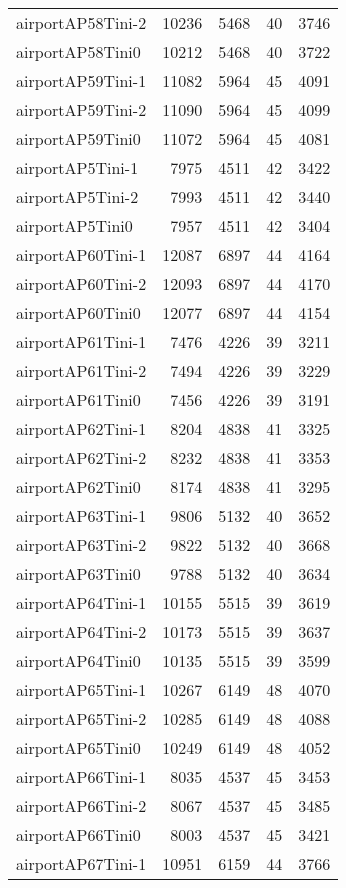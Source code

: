 \begin{longtable}{lrrrr}
airportAP58Tini-2 & 10236 & 5468 & 40 & 3746 \\
airportAP58Tini0 & 10212 & 5468 & 40 & 3722 \\
airportAP59Tini-1 & 11082 & 5964 & 45 & 4091 \\
airportAP59Tini-2 & 11090 & 5964 & 45 & 4099 \\
airportAP59Tini0 & 11072 & 5964 & 45 & 4081 \\
airportAP5Tini-1 & 7975 & 4511 & 42 & 3422 \\
airportAP5Tini-2 & 7993 & 4511 & 42 & 3440 \\
airportAP5Tini0 & 7957 & 4511 & 42 & 3404 \\
airportAP60Tini-1 & 12087 & 6897 & 44 & 4164 \\
airportAP60Tini-2 & 12093 & 6897 & 44 & 4170 \\
airportAP60Tini0 & 12077 & 6897 & 44 & 4154 \\
airportAP61Tini-1 & 7476 & 4226 & 39 & 3211 \\
airportAP61Tini-2 & 7494 & 4226 & 39 & 3229 \\
airportAP61Tini0 & 7456 & 4226 & 39 & 3191 \\
airportAP62Tini-1 & 8204 & 4838 & 41 & 3325 \\
airportAP62Tini-2 & 8232 & 4838 & 41 & 3353 \\
airportAP62Tini0 & 8174 & 4838 & 41 & 3295 \\
airportAP63Tini-1 & 9806 & 5132 & 40 & 3652 \\
airportAP63Tini-2 & 9822 & 5132 & 40 & 3668 \\
airportAP63Tini0 & 9788 & 5132 & 40 & 3634 \\
airportAP64Tini-1 & 10155 & 5515 & 39 & 3619 \\
airportAP64Tini-2 & 10173 & 5515 & 39 & 3637 \\
airportAP64Tini0 & 10135 & 5515 & 39 & 3599 \\
airportAP65Tini-1 & 10267 & 6149 & 48 & 4070 \\
airportAP65Tini-2 & 10285 & 6149 & 48 & 4088 \\
airportAP65Tini0 & 10249 & 6149 & 48 & 4052 \\
airportAP66Tini-1 & 8035 & 4537 & 45 & 3453 \\
airportAP66Tini-2 & 8067 & 4537 & 45 & 3485 \\
airportAP66Tini0 & 8003 & 4537 & 45 & 3421 \\
airportAP67Tini-1 & 10951 & 6159 & 44 & 3766 \\

\end{longtable}
